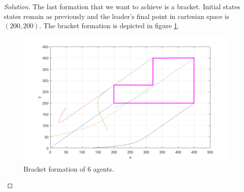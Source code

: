 \documentclass[12pt]{article}
\newenvironment{solution}{\begin{proof}[Solution]}{\end{proof}}
\begin{document}
\begin{solution}
The last formation that we want to achieve is a bracket. Initial states states remain as previously and the leader's final point in cartesian space is $(200,200)$. The bracket formation is depicted in figure \ref{bracket_xy}.  
\begin{figure}[!h]
	\includegraphics[scale=0.6]{figures/BracketFormation.png}
	\centering
	\caption{Bracket formation of 6 agents.}
	\label{bracket_xy}
\end{figure}


\end{solution}
\end{document}
